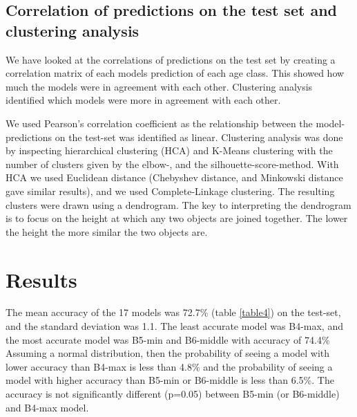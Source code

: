 \documentclass[10pt,letterpaper]{article}
\begin{document}


\subsection*{Correlation of predictions on the test set and clustering analysis}

We have looked at the correlations of predictions on the test set by creating a correlation matrix of each models prediction of each age class. This showed how much the models were in agreement with each other. Clustering analysis identified which models were more in agreement with each other.

We used Pearson's correlation coefficient as the relationship between the model-predictions on the test-set was identified as linear. Clustering analysis was done by inspecting hierarchical clustering (HCA) and K-Means clustering with the number of clusters given by the elbow-, and the silhouette-score-method.
With HCA we used Euclidean distance (Chebyshev distance, and Minkowski distance gave similar results), and we used Complete-Linkage clustering. The resulting clusters were drawn using a dendrogram. The key to interpreting the dendrogram is to focus on the height at which any two objects are joined together. The lower the height the more similar the two objects are.

\section*{Results}

The mean accuracy of the 17 models was 72.7\% (table \ref{table4}) on the test-set, and 
the standard deviation was 1.1.
The least accurate model was B4-max, and the most
accurate model was B5-min and B6-middle with accuracy of 74.4\%
Assuming a normal distribution, then the probability of seeing 
a model with lower accuracy than B4-max is less than 4.8\%
and the probability of seeing a model with higher accuracy than
B5-min or B6-middle is less than 6.5\%. The accuracy is not significantly different (p=0.05) between B5-min (or B6-middle) and B4-max model.  
\end{document}

